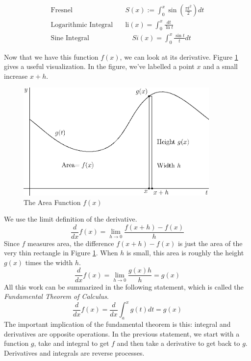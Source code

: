 \documentclass[fleqn]{report}
\begin{document}
\begin{example}
\begin{align*}
\text{Fresnel} \quad & S(x) := \int_0^x \sin \left(\frac{\pi t^2}{2}
\right) dt \\
\text{Logarithmic Integral} \quad & \text{li}(x) = \int_0^x
\frac{dt}{\ln t} \\
\text{Sine Integral} & \quad Si(x) = \int_0^x \frac{\sin t}{t} dt
\end{align*}
\end{example}

Now that we have this function $f(x)$, we can look at its
derivative. Figure \ref{figure-area-function} gives a useful
visualization. In the figure,  we've labelled a
point $x$ and a small increase $x+h$.

\begin{figure}[ht]
\centering
\includegraphics[width=10cm]{figure53.eps}
\caption{The Area Function $f(x)$}
\label{figure-area-function}
\end{figure}

We use the limit definition of the derivative.
\begin{equation*}
\frac{d}{dx} f(x) = \lim_{h \rightarrow 0} \frac{f(x+h) - f(x)}{h}
\end{equation*}
Since $f$ measures area, the difference $f(x+h) - f(x)$ is just
the area of the very thin rectangle in Figure
\ref{figure-area-function}.  When $h$ is small, this area is roughly
the height $g(x)$ times the width $h$.
\begin{equation*}
\frac{d}{dx} f(x) = \lim_{h \rightarrow 0} \frac{g(x) h}{h} =
g(x)
\end{equation*}
All this work can be summarized in the following statement,
which is called the \emph{Fundamental Theorem of Calculus}.
\begin{equation*}
\frac{d}{dx} f(x) = \frac{d}{dx} \int_a^x g(t) dt = g(x) 
\end{equation*}
The important implication of the fundamental theorem is this:
integral and derivatives are opposite operations. In the
previous statement, we start with a function $g$, take and
integral to get $f$ and then take a derivative to get back to
$g$. Derivatives and integrals are reverse
processes.
\end{document}

